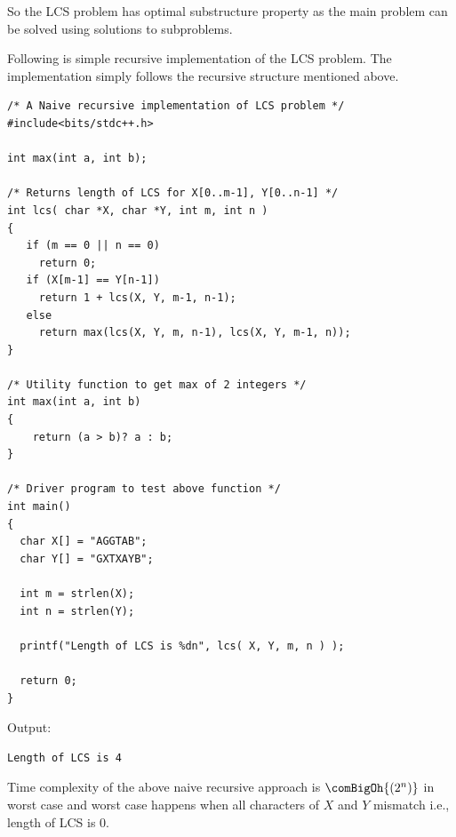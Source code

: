So the LCS problem has optimal substructure property as the main problem can
be solved using solutions to subproblems.


Following is simple recursive implementation of the LCS problem. The
implementation simply follows the recursive structure mentioned above.
\begin{lstlisting}[style=raycppnewsnippet]
/* A Naive recursive implementation of LCS problem */
#include<bits/stdc++.h>
 
int max(int a, int b);
 
/* Returns length of LCS for X[0..m-1], Y[0..n-1] */
int lcs( char *X, char *Y, int m, int n )
{
   if (m == 0 || n == 0)
     return 0;
   if (X[m-1] == Y[n-1])
     return 1 + lcs(X, Y, m-1, n-1);
   else
     return max(lcs(X, Y, m, n-1), lcs(X, Y, m-1, n));
}
 
/* Utility function to get max of 2 integers */
int max(int a, int b)
{
    return (a > b)? a : b;
}
 
/* Driver program to test above function */
int main()
{
  char X[] = "AGGTAB";
  char Y[] = "GXTXAYB";
 
  int m = strlen(X);
  int n = strlen(Y);
 
  printf("Length of LCS is %dn", lcs( X, Y, m, n ) );
 
  return 0;
}
\end{lstlisting}
Output:
\begin{lstlisting}[style=rayio]
Length of LCS is 4
\end{lstlisting}
Time complexity of the above naive recursive approach is $\comBigOh{(2^n)}$
in worst case and worst case happens when all characters of $X$ and $Y$
mismatch i.e., length of LCS is $0$.

